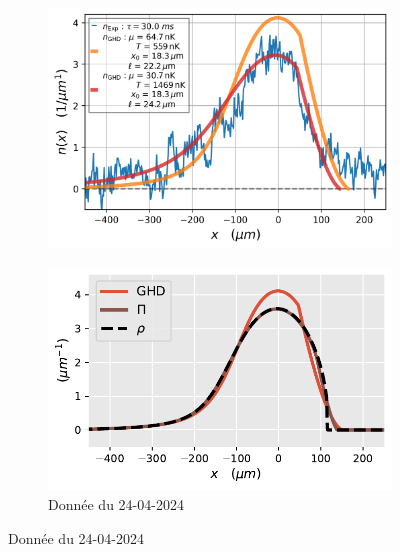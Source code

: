 \documentclass[submission, Phys]{SciPost}
\begin{document}
\begin{figure}[ht]
\begin{subfigure}[b]{0.24\textwidth}
        		\includegraphics[width=\textwidth]{Figures/article_simul_expansion_1_24-04-2024}
        		\caption{}
        		\label{fig:simul_expansion}
    		\end{subfigure}
    		\hfill
    		\begin{subfigure}[b]{0.24\textwidth}
    			\centering
				\includegraphics[width=\textwidth]{Figures/article_distribution_24-04-2024}		
				\caption{Donnée du 24-04-2024}
   				\label{}    			
    		\end{subfigure}    		
    		\caption{Donnée du 24-04-2024}
   			\label{}					
		\end{figure}
		
\end{document}
